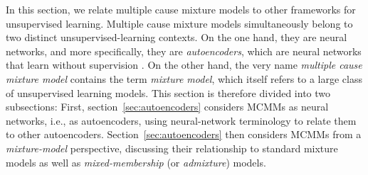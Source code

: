 In this section, we relate multiple cause mixture models to other frameworks for unsupervised learning. 
Multiple cause mixture models simultaneously belong to two distinct unsupervised-learning contexts. 
On the one hand, they are neural networks, and more specifically, they are \emph{autoencoders}, which are neural networks that learn without supervision \citep{dayan-and-zemel:95}.
On the other hand, the very name 
\emph{multiple cause mixture model} 
contains the term \emph{mixture model}, which itself refers to a large class of unsupervised learning models. 
This section is therefore divided into two subsections: First, section~\ref{sec:autoencoders} 
considers MCMMs as neural networks, i.e., as autoencoders, using neural-network terminology 
to relate them to other autoencoders. Section~\ref{sec:autoencoders} then 
considers MCMMs from a \emph{mixture-model} perspective, discussing their relationship to standard mixture models as well as \emph{mixed-membership} (or \emph{admixture}) models. 

